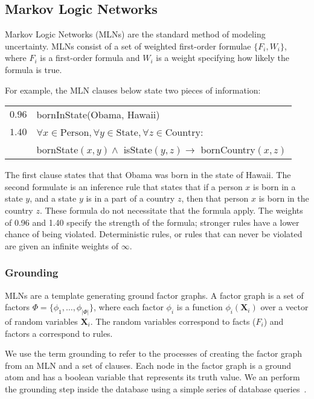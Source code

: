 \subsection{Markov Logic Networks}

Markov Logic Networks (MLNs) are the standard method of modeling uncertainty.
MLNs consist of a set of weighted first-order formulae \(\{F_i, W_i\}\),
where \(F_i\) is a first-order formula and \(W_i\) is a weight
specifying how likely the formula is true.

For example, the MLN clauses below state two pieces of information:

\vspace{5pt}
\noindent\begin{tabular}{l l}
\(0.96\) & bornInState(Obama, Hawaii)\\
\(1.40\) & $\forall x\in\text{Person}, \forall y\in\text{State}, \forall z\in\text{Country}$:\\
         & bornState$(x,y) \wedge$ isState$(y,z) \rightarrow$ bornCountry$(x,z)$
\end{tabular}

The first clause states that that Obama was born in the state of Hawaii.
The second formulate is an inference rule that states that if a person \(x\) is born in a state \(y\), and a state \(y\) is in a part of a country \(z\),
then that person \(x\) is born in the country \(z\).
These formula do not necessitate that the formula apply.
The weights of 0.96 and 1.40 specify the strength of the formula; stronger rules have a lower chance of being violated.
Deterministic rules, or rules that can never be violated are given an infinite weights of \(\infty\).


\subsubsection{Grounding}

MLNs are a template generating ground factor graphs.
A factor graph is a set of factors \(\Phi = \{ \phi_1, \ldots, \phi_{|\Phi|} \} \),
where each factor \(\phi_i\) is a function \(\phi_i (\mathbf{X}_i)\) over a
vector of random variables \(\mathbf{X}_i\).
The random variables correspond to facts (\(F_i\)) and factors a correspond to rules.

We use the term grounding to refer to the processes of creating the factor graph from an
MLN and a set of clauses.
Each node in the factor graph is a ground atom and has a boolean variable that represents its truth value.
We an perform the grounding step inside the database using a simple series of database queries~\cite{chen2014knowledge}.

